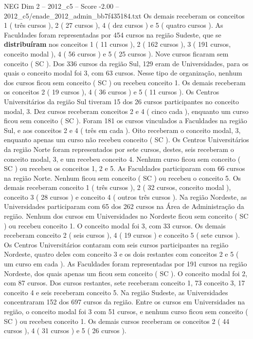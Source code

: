 \begin{textsample}{NEG Dim 2 – 2012\_c5 – Score -2.00 – 2012\_c5/enade\_2012\_admin\_bb7f435184.txt}
Os demais receberam os conceitos 1 ( três cursos ), 2 ( 27 cursos ), 4 ( dez cursos ) e 5 ( quatro cursos ).
As Faculdades foram representadas por 454 cursos na região Sudeste, que se \textbf{distribuíram} nos conceitos 1 ( 11 cursos ), 2 ( 162 cursos ), 3 ( 191 cursos, conceito modal ), 4 ( 56 cursos ) e 5 ( 25 cursos ).
Nove cursos ficaram sem conceito ( SC ).
Dos 336 cursos da região Sul, 129 eram de Universidades, para os quais o conceito modal foi 3, com 63 cursos.
Nesse tipo de organização, nenhum dos cursos ficou sem conceito ( SC ) ou recebeu conceito 1.
Os demais receberam os conceitos 2 ( 19 cursos ), 4 ( 36 cursos ) e 5 ( 11 cursos ).
Os Centros Universitários da região Sul tiveram 15 dos 26 cursos participantes no conceito modal, 3.
Dez cursos receberam conceitos 2 e 4 ( cinco cada ), enquanto um curso ficou sem conceito ( SC ).
Foram 181 os cursos vinculados a Faculdades na região Sul, e aos conceitos 2 e 4 ( três em cada ).
Oito receberam o conceito modal, 3, enquanto apenas um curso não recebeu conceito ( SC ).
Os Centros Universitários da região Norte foram representados por sete cursos, destes, seis receberam o conceito modal, 3, e um recebeu conceito 4.
Nenhum curso ficou sem conceito ( SC ) ou recebeu os conceitos 1, 2 e 5.
As Faculdades participaram com 66 cursos na região Norte.
Nenhum ficou sem conceito ( SC ) ou recebeu o conceito 5.
Os demais receberam conceito 1 ( três cursos ), 2 ( 32 cursos, conceito modal ), conceito 3 ( 28 cursos ) e conceito 4 ( outros três cursos ).
Na região Nordeste, as Universidades participaram com 65 dos 262 cursos na Área de Administração da região.
Nenhum dos cursos em Universidades no Nordeste ficou sem conceito ( SC ) ou recebeu conceito 1.
O conceito modal foi 3, com 33 cursos.
Os demais receberam conceito 2 ( seis cursos ), 4 ( 19 cursos ) e conceito 5 ( sete cursos ).
Os Centros Universitários contaram com seis cursos participantes na região Nordeste, quatro deles com conceito 3 e os dois restantes com conceitos 2 e 5 ( um curso em cada ).
As Faculdades foram representadas por 191 cursos na região Nordeste, dos quais apenas um ficou sem conceito ( SC ).
O conceito modal foi 2, com 87 cursos.
Dos cursos restantes, sete receberam conceito 1, 73 conceito 3, 17 conceito 4 e seis receberam conceito 5.
Na região Sudeste, as Universidades concentraram 152 dos 697 cursos da região.
Entre os cursos em Universidades na região, o conceito modal foi 3 com 51 cursos, e nenhum curso ficou sem conceito ( SC ) ou recebeu conceito 1.
Os demais cursos receberam os conceitos 2 ( 44 cursos ), 4 ( 31 cursos ) e 5 ( 26 cursos ).

\end{textsample}
